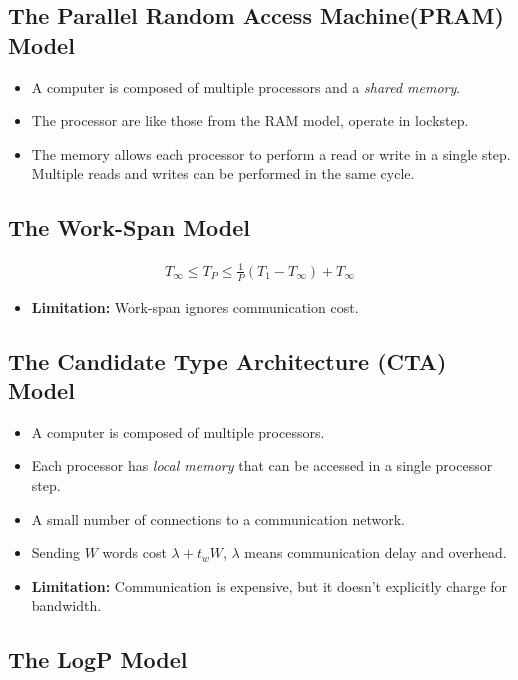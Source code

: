 \documentclass[../main.tex]{subfiles}
\begin{document}
\subsection{The Parallel Random Access Machine(PRAM) Model}

\begin{itemize}
	\item A computer is composed of multiple processors and a \textit{shared memory}.
	\item The processor are like those from the RAM model, operate in lockstep.
	\item The memory allows each processor to perform a read or write in a single step. Multiple reads and writes can be performed in the same cycle.
\end{itemize}

\subsection{The Work-Span Model}

\begin{align*}
	T_\infty \leq T_P \leq \frac{1}{P}(T_1 - T_\infty) + T_\infty
\end{align*}

\begin{itemize}
	\item \textbf{Limitation:} Work-span ignores communication cost.
\end{itemize}

\subsection{The Candidate Type Architecture (CTA) Model}

\begin{itemize}
	\item A computer is composed of multiple processors.
	\item Each processor has \textit{local memory} that can be accessed in a single processor step.
	\item A small number of connections to a communication network.
	\item Sending \(W\) words cost \(\lambda + t_w W\), \(\lambda\) means communication delay and overhead.
	\item \textbf{Limitation:} Communication is expensive, but it doesn’t explicitly charge for bandwidth.
\end{itemize}

\subsection{The LogP Model}
\end{document}
